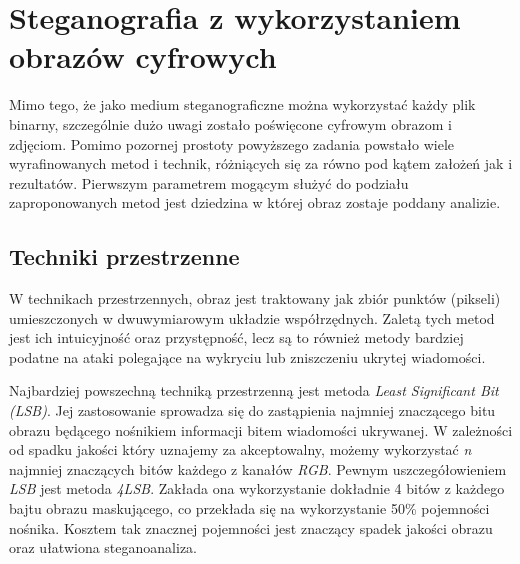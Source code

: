 {    \section{Steganografia z wykorzystaniem obrazów cyfrowych}
    {
        Mimo tego, że jako medium steganograficzne można wykorzystać każdy plik binarny, szczególnie dużo uwagi zostało
        poświęcone cyfrowym obrazom i zdjęciom. Pomimo pozornej prostoty powyższego zadania powstało wiele
        wyrafinowanych metod i technik, różniących się za równo pod kątem założeń jak i rezultatów. Pierwszym parametrem
        mogącym służyć do podziału zaproponowanych metod jest dziedzina w której  obraz zostaje poddany analizie.

        \subsection{Techniki przestrzenne}
        {
            W technikach przestrzennych, obraz jest traktowany jak zbiór punktów (pikseli) umieszczonych w dwuwymiarowym
            układzie współrzędnych. Zaletą tych metod jest ich intuicyjność oraz przystępność, lecz są to również metody
            bardziej podatne na ataki polegające na wykryciu lub zniszczeniu ukrytej wiadomości\cite{Sharma2020AnIS}.

            Najbardziej powszechną techniką przestrzenną jest metoda \textit{Least Significant Bit (LSB)}. Jej
            zastosowanie  sprowadza się do zastąpienia najmniej znaczącego bitu obrazu będącego nośnikiem informacji
            bitem wiadomości  ukrywanej. W zależności od spadku jakości który uznajemy za akceptowalny, możemy
            wykorzystać \textit{n} najmniej  znaczących bitów każdego z kanałów \textit{RGB}. Pewnym uszczegółowieniem
            \textit{LSB} jest metoda  \textit{4LSB}. Zakłada ona wykorzystanie dokładnie 4 bitów z każdego bajtu obrazu
            maskującego, co przekłada się  na wykorzystanie 50\% pojemności nośnika. Kosztem tak znacznej pojemności
            jest znaczący spadek jakości obrazu  oraz ułatwiona steganoanaliza.

}}}
